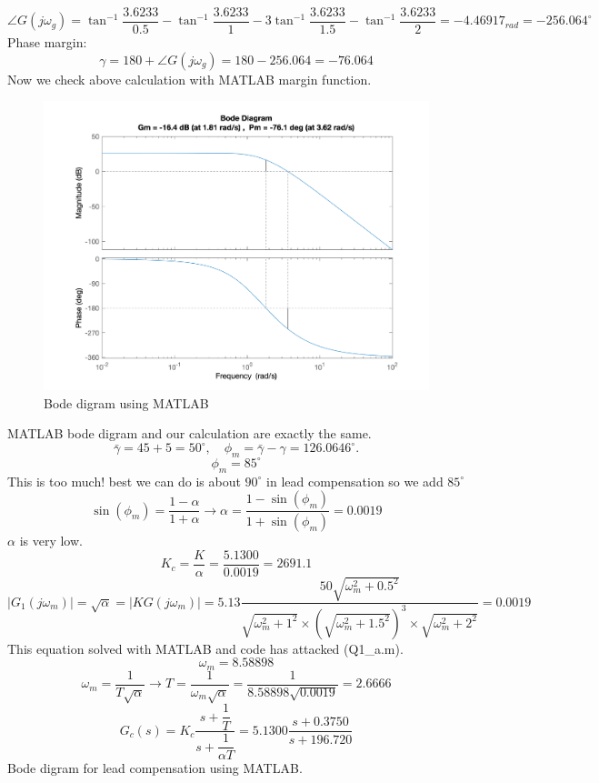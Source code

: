 $$
\angle G(j\omega_g) = \tan^{-1}\dfrac{3.6233}{0.5} - \tan^{-1}\dfrac{3.6233}{1} - 3\tan^{-1}\dfrac{3.6233}{1.5} - \tan^{-1}\dfrac{3.6233}{2} = -4.46917_{rad} = -256.064^{\circ}
$$
Phase margin:
$$
\gamma = 180 + \angle G(j\omega_g) = 180 - 256.064 = -76.064
$$
Now we check above calculation with MATLAB margin function.
\begin{figure}[H]
	\caption{Bode digram using MATLAB}
	\centering
	\includegraphics[width=12cm]{../Figure/Q1/a/margin.png}
\end{figure}
MATLAB bode digram and our calculation are exactly the same.
$$
\bar{\gamma} = 45 + 5 = 50^{\circ},\quad \phi_m = \bar{\gamma} - \gamma = 126.0646^{\circ}.
$$
$$
\phi_m = 85^{\circ}
$$
This is too much!
best we can do is about $90^{\circ}$ in lead compensation so we add $85^{\circ}$
$$
\sin(\phi_m) = \dfrac{1-\alpha}{1+\alpha} \to
\alpha = \dfrac{1-\sin(\phi_m) }{1+\sin(\phi_m) } = 0.0019
$$
$\alpha$ is very low.
$$
K_c = \dfrac{K}{\alpha} = \dfrac{5.1300}{0.0019} = 2691.1
$$
$$
\left\vert G_1(j\omega_m) \right\vert = \sqrt{\alpha} = \left\vert KG(j\omega_m) \right\vert = 5.13 \dfrac{50\sqrt{\omega_m^2+0.5^2}}{\sqrt{\omega_m^2+1^2}\times(\sqrt{\omega_m^2 + 1.5^2})^3\times\sqrt{\omega_m^2 + 2^2}} = 0.0019
$$
This equation solved with MATLAB and code has attacked (Q1\_a.m).
$$
\omega_m = 8.58898
$$
$$
\omega_m = \dfrac{1}{T\sqrt{\alpha}} \to
T = \dfrac{1}{\omega_m\sqrt{\alpha}} = \dfrac{1}{8.58898\sqrt{0.0019}} = 2.6666
$$
$$
G_c(s) = K_c \dfrac{s + \dfrac{1}{T}}{s + \dfrac{1}{\alpha T}} = 5.1300\dfrac{s + 0.3750}{s + 196.720}
$$
Bode digram for lead compensation using MATLAB.
